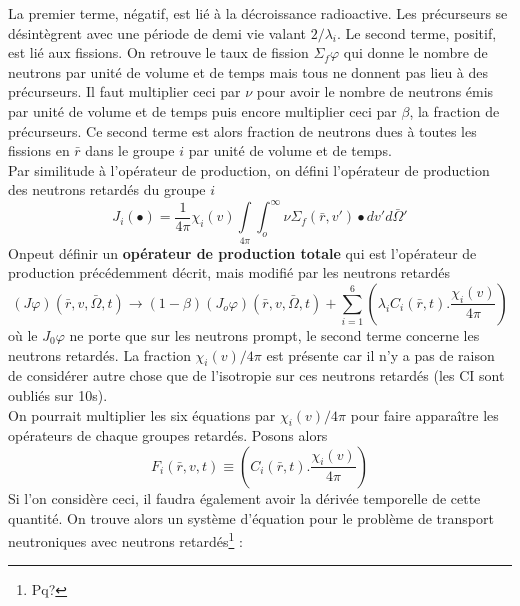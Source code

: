 La premier terme, négatif, est lié à la décroissance radioactive. Les précurseurs se désintègrent 
avec une période de demi vie valant $2/\lambda_i$. Le second terme, positif, est lié aux fissions. 
On retrouve le taux de fission $\Sigma_f\varphi$ qui donne le nombre de neutrons par unité de volume 
et de temps mais tous ne donnent pas lieu à des précurseurs. Il faut multiplier ceci par $\nu$ pour 
avoir le nombre de neutrons émis par unité de volume et de temps puis encore multiplier ceci par 
$\beta$, la fraction de précurseurs. Ce second terme est alors fraction de neutrons dues à toutes 
les fissions en $\bar r$ dans le groupe $i$ par unité de volume et de temps.\\

Par similitude à l'opérateur de production, on défini l'opérateur de production des neutrons 
retardés du groupe $i$
\begin{equation}
{J_i}( \bullet ) = \frac{1}{{4\pi }}{\chi _i}(v)\int\limits_{4\pi }    \int_o^\infty     \nu {\Sigma _f}(\bar r,v') \bullet dv'd\bar \Omega '
\end{equation}
Onpeut définir un \textbf{opérateur de production totale} qui est l'opérateur de production 
précédemment décrit, mais modifié par les neutrons retardés
\begin{equation}
(J\varphi )(\bar r,v,\bar \Omega ,t) \to (1 - \beta )({J_o}\varphi )(\bar r,v,\bar \Omega ,t) + \sum\limits_{i = 1}^6    \left( {{\lambda _i}{C_i}(\bar r,t).\frac{{{\chi _i}(v)}}{{4\pi }}} \right)
\end{equation}
où le $J_0\varphi$ ne porte que sur les neutrons prompt, le second terme concerne les 
neutrons retardés. La fraction $\chi_i(v)/4\pi$ est présente car il n'y a pas de raison de considérer 
autre chose que de l'isotropie sur ces  neutrons retardés (les CI sont oubliés sur 10s).\\

On pourrait multiplier les six équations par $\chi_i(v)/4\pi$ pour faire apparaître les opérateurs 
de chaque groupes retardés. Posons alors
\begin{equation}
{F_i}(\bar r,v,t) \equiv \left( {{C_i}(\bar r,t).\frac{{{\chi _i}(v)}}{{4\pi }}} \right)
\end{equation}
Si l'on considère ceci, il faudra également avoir la dérivée temporelle de cette quantité. On trouve 
alors un système d'équation pour le problème de transport neutroniques avec neutrons retardés\footnote{Pq?} :\\


